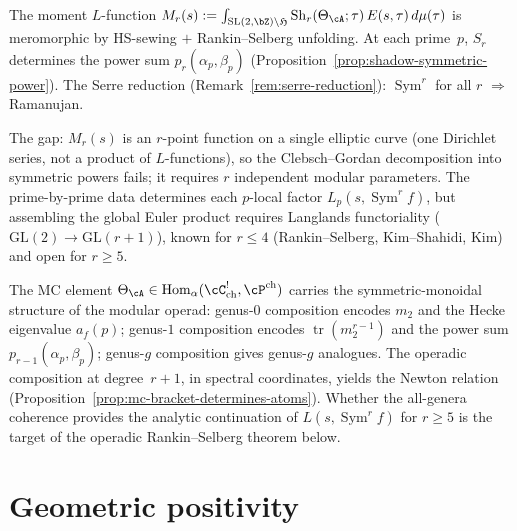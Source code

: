 \begin{remark}%
\label{rem:mc-rigidity-diagnosis}%
%
The moment $L$-function
$M_r(s) := \int_{\mathrm{SL}(2,\bZ)\backslash\mathfrak{H}}
\operatorname{Sh}_r(\Theta_\cA;\tau)\,E(s,\tau)\,d\mu(\tau)$
is meromorphic by HS-sewing $+$ Rankin--Selberg unfolding.
At each prime~$p$, $S_r$ determines the power sum
$p_r(\alpha_p,\beta_p)$
(Proposition~\ref{prop:shadow-symmetric-power}).
The Serre reduction (Remark~\ref{rem:serre-reduction}):
$\operatorname{Sym}^r$ for all $r$ $\Rightarrow$ Ramanujan.

The gap: $M_r(s)$ is an $r$-point function on a single
elliptic curve (one Dirichlet series, not a product of
$L$-functions), so the Clebsch--Gordan decomposition into
symmetric powers fails; it requires $r$ independent modular
parameters. The prime-by-prime data determines each $p$-local
factor $L_p(s, \operatorname{Sym}^r f)$, but assembling the
global Euler product requires Langlands functoriality
($\mathrm{GL}(2) \to \mathrm{GL}(r{+}1)$), known for
$r \le 4$ (Rankin--Selberg, Kim--Shahidi, Kim) and open
for $r \ge 5$.
\end{remark}

\begin{remark}%
\label{rem:operadic-transfer}%
%
The MC element $\Theta_\cA \in
\mathrm{Hom}_\alpha(\cC^!_{\mathrm{ch}}, \cP^{\mathrm{ch}})$
carries the symmetric-monoidal structure of the modular operad:
genus-$0$ composition encodes $m_2$ and the Hecke eigenvalue $a_f(p)$;
genus-$1$ composition encodes $\operatorname{tr}(m_2^{r-1})$
and the power sum $p_{r-1}(\alpha_p, \beta_p)$;
genus-$g$ composition gives genus-$g$ analogues.
The operadic composition at degree~$r{+}1$, in spectral
coordinates, yields the Newton relation
(Proposition~\ref{prop:mc-bracket-determines-atoms}).
Whether the all-genera coherence provides the analytic continuation
of $L(s, \operatorname{Sym}^r f)$ for $r \ge 5$ is the
target of the operadic Rankin--Selberg theorem below.
\end{remark}

\section{Geometric positivity}%
\label{sec:geometric-positivity}%

